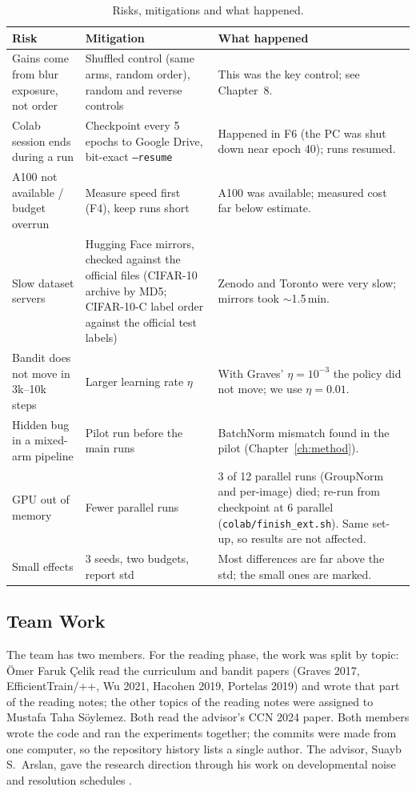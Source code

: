 \documentclass[a4paper,12pt]{report}
\begin{document}
\begin{table}[htbp]
\caption{Risks, mitigations and what happened.}
\label{tab:risk}
\begin{center}
\footnotesize
\begin{tabular}{|P{3.6cm}|P{5.0cm}|P{5.3cm}|} \hline
\textbf{Risk} & \textbf{Mitigation} & \textbf{What happened} \\ \hline
Gains come from blur exposure, not order \cite{wu2021curricula,katzhendler2019} & Shuffled control (same arms, random order), random and reverse controls & This was the key control; see Chapter~8. \\ \hline
Colab session ends during a run & Checkpoint every 5 epochs to Google Drive, bit-exact \texttt{--resume} & Happened in F6 (the PC was shut down near epoch 40); runs resumed. \\ \hline
A100 not available / budget overrun & Measure speed first (F4), keep runs short & A100 was available; measured cost far below estimate. \\ \hline
Slow dataset servers & Hugging Face mirrors, checked against the official files (CIFAR-10 archive by MD5; CIFAR-10-C label order against the official test labels) & Zenodo and Toronto were very slow; mirrors took $\sim$1.5\,min. \\ \hline
Bandit does not move in 3k--10k steps & Larger learning rate $\eta$ & With Graves' $\eta=10^{-3}$ the policy did not move; we use $\eta=0.01$. \\ \hline
Hidden bug in a mixed-arm pipeline & Pilot run before the main runs & BatchNorm mismatch found in the pilot (Chapter~\ref{ch:method}). \\ \hline
GPU out of memory & Fewer parallel runs & 3 of 12 parallel runs (GroupNorm and per-image) died; re-run from checkpoint at 6 parallel (\texttt{colab/finish\_ext.sh}). Same set-up, so results are not affected. \\ \hline
Small effects & 3 seeds, two budgets, report std & Most differences are far above the std; the small ones are marked. \\ \hline
\end{tabular}
\end{center}
\end{table}

\subsection{Team Work}

The team has two members. For the reading phase, the work was split by topic: Ömer Faruk Çelik read the curriculum and bandit papers (Graves 2017, EfficientTrain/++, Wu 2021, Hacohen 2019, Portelas 2019) and wrote that part of the reading notes; the other topics of the reading notes were assigned to Mustafa Taha Söylemez. Both read the advisor's CCN 2024 paper. Both members wrote the code and ran the experiments together; the commits were made from one computer, so the repository history lists a single author. The advisor, Suayb S.\ Arslan, gave the research direction through his work on developmental noise and resolution schedules \cite{arslan2024noise}.
\end{document}
